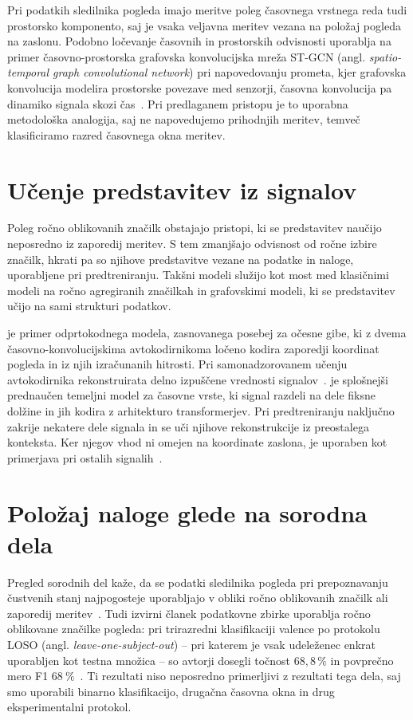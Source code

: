 Pri podatkih sledilnika pogleda imajo meritve poleg časovnega vrstnega reda tudi prostorsko komponento, saj je vsaka veljavna meritev vezana na položaj pogleda na zaslonu.
Podobno ločevanje časovnih in prostorskih odvisnosti uporablja na primer časovno-prostorska grafovska konvolucijska mreža ST-GCN (angl. \emph{spatio-temporal graph convolutional network}) pri napovedovanju prometa, kjer grafovska konvolucija modelira prostorske povezave med senzorji, časovna konvolucija pa dinamiko signala skozi čas~\cite{yu2018stgcn}.
Pri predlaganem pristopu je to uporabna metodološka analogija, saj ne napovedujemo prihodnjih meritev, temveč klasificiramo razred časovnega okna meritev.

\section{Učenje predstavitev iz signalov}
\label{subsec:ucenje-predstavitev-signalov}

Poleg ročno oblikovanih značilk obstajajo pristopi, ki se predstavitev naučijo neposredno iz zaporedij meritev.
S tem zmanjšajo odvisnost od ročne izbire značilk, hkrati pa so njihove predstavitve vezane na podatke in naloge, uporabljene pri predtreniranju.
Takšni modeli služijo kot most med klasičnimi modeli na ročno agregiranih značilkah in grafovskimi modeli, ki se predstavitev učijo na sami strukturi podatkov.

 je primer odprtokodnega modela, zasnovanega posebej za očesne gibe, ki z dvema časovno-konvolucijskima avtokodirnikoma ločeno kodira zaporedji koordinat pogleda in iz njih izračunanih hitrosti.
Pri samonadzorovanem učenju avtokodirnika rekonstruirata delno izpuščene vrednosti signalov~\cite{bautista2021gazemae}.
 je splošnejši prednaučen temeljni model za časovne vrste, ki signal razdeli na dele fiksne dolžine in jih kodira z arhitekturo transformerjev.
Pri predtreniranju naključno zakrije nekatere dele signala in se uči njihove rekonstrukcije iz preostalega konteksta.
Ker njegov vhod ni omejen na koordinate zaslona, je uporaben kot primerjava pri ostalih signalih~\cite{goswami2024moment}.

\section{Položaj naloge glede na sorodna dela}
\label{subsec:polozaj-naloge-sorodna-dela}

Pregled sorodnih del kaže, da se podatki sledilnika pogleda pri prepoznavanju čustvenih stanj najpogosteje uporabljajo v obliki ročno oblikovanih značilk ali zaporedij meritev~\cite{lim2020emotion,tarnowski2020eye,lu2015combining_eye_eeg}.
Tudi izvirni članek podatkovne zbirke \MAHNOB{} uporablja ročno oblikovane značilke pogleda: pri trirazredni klasifikaciji valence po protokolu LOSO (angl. \emph{leave-one-subject-out}) -- pri katerem je vsak udeleženec enkrat uporabljen kot testna množica -- so avtorji dosegli točnost $68{,}8\,\%$ in povprečno mero F1 $68~\%$~\cite{soleymani2012mahnob}.
Ti rezultati niso neposredno primerljivi z rezultati tega dela, saj smo uporabili binarno klasifikacijo, drugačna časovna okna in drug eksperimentalni protokol.

